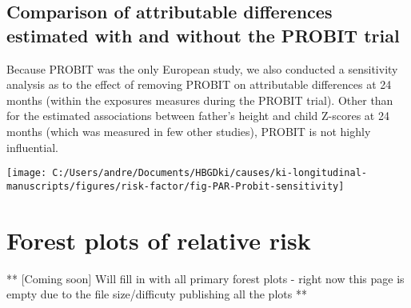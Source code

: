\documentclass[9pt,]{book}
\begin{document}
\raggedright

\section{Comparison of attributable differences estimated with and
without the PROBIT
trial}\label{comparison-of-attributable-differences-estimated-with-and-without-the-probit-trial}

Because PROBIT was the only European study, we also conducted a
sensitivity analysis as to the effect of removing PROBIT on attributable
differences at 24 months (within the exposures measures during the
PROBIT trial). Other than for the estimated associations between
father's height and child Z-scores at 24 months (which was measured in
few other studies), PROBIT is not highly influential.

\texttt{[image: C:/Users/andre/Documents/HBGDki/causes/ki-longitudinal-manuscripts/figures/risk-factor/fig-PAR-Probit-sensitivity]}

\chapter{Forest plots of relative risk}\label{RR-forest}

\raggedright

** {[}Coming soon{]} Will fill in with all primary forest plots - right
now this page is empty due to the file size/difficuty publishing all the
plots **


\end{document}
